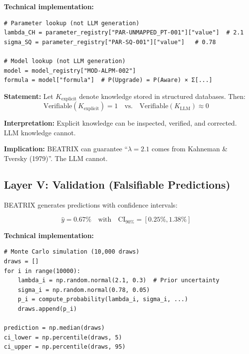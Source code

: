 \textbf{Technical implementation:}

\begin{verbatim}
# Parameter lookup (not LLM generation)
lambda_CH = parameter_registry["PAR-UNMAPPED_PT-001"]["value"]  # 2.1
sigma_SQ = parameter_registry["PAR-SQ-001"]["value"]   # 0.78

# Model lookup (not LLM generation)
model = model_registry["MOD-ALPM-002"]
formula = model["formula"]  # P(Upgrade) = P(Aware) × Σ[...]
\end{verbatim}

\begin{tcolorbox}[colback=gray!5!white, colframe=gray!75!black,
    title=Axiom UNMAPPED_BX-2: Explicit Knowledge]
\textbf{Statement:} Let $K_{\text{explicit}}$ denote knowledge stored in structured databases. Then:
\begin{equation}
\text{Verifiable}(K_{\text{explicit}}) = 1 \quad \text{vs.} \quad \text{Verifiable}(K_{\text{LLM}}) \approx 0
\end{equation}

\textbf{Interpretation:} Explicit knowledge can be inspected, verified, and corrected. LLM knowledge cannot.

\textbf{Implication:} BEATRIX can guarantee ``$\lambda = 2.1$ comes from Kahneman \& Tversky (1979)''. The LLM cannot.
\end{tcolorbox}


\subsection{Layer V: Validation (Falsifiable Predictions)}

BEATRIX generates predictions with confidence intervals:

\begin{equation}
\hat{y} = 0.67\% \quad \text{with} \quad \text{CI}_{90\%} = [0.25\%, 1.38\%]
\end{equation}

\textbf{Technical implementation:}

\begin{verbatim}
# Monte Carlo simulation (10,000 draws)
draws = []
for i in range(10000):
    lambda_i = np.random.normal(2.1, 0.3)  # Prior uncertainty
    sigma_i = np.random.normal(0.78, 0.05)
    p_i = compute_probability(lambda_i, sigma_i, ...)
    draws.append(p_i)

prediction = np.median(draws)
ci_lower = np.percentile(draws, 5)
ci_upper = np.percentile(draws, 95)
\end{verbatim}

